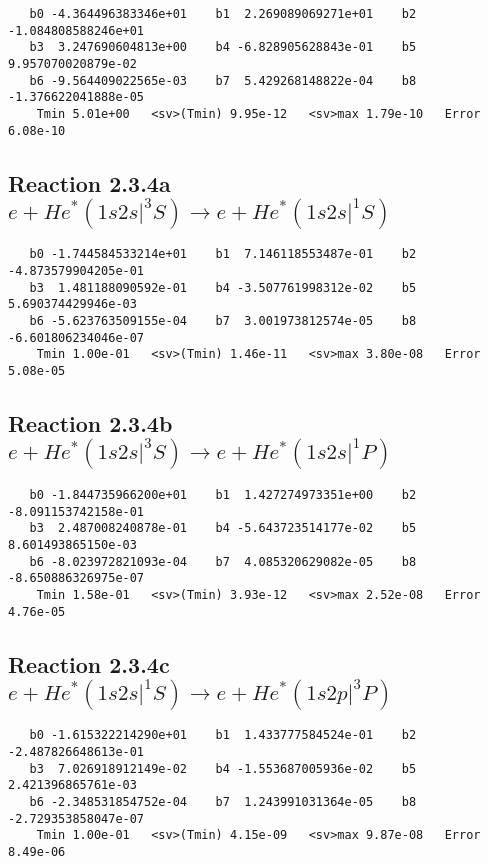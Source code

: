 \documentclass[12pt]{article}
\begin{document}
\begin{small}\begin{verbatim}
   b0 -4.364496383346e+01    b1  2.269089069271e+01    b2 -1.084808588246e+01
   b3  3.247690604813e+00    b4 -6.828905628843e-01    b5  9.957070020879e-02
   b6 -9.564409022565e-03    b7  5.429268148822e-04    b8 -1.376622041888e-05
    Tmin 5.01e+00   <sv>(Tmin) 9.95e-12   <sv>max 1.79e-10   Error 6.08e-10
\end{verbatim}\end{small}

\newpage
\subsection{
Reaction 2.3.4a $  e + He^*(1s2s|^3S) \rightarrow e + He^*(1s2s|^1S)$}


\begin{small}\begin{verbatim}
   b0 -1.744584533214e+01    b1  7.146118553487e-01    b2 -4.873579904205e-01
   b3  1.481188090592e-01    b4 -3.507761998312e-02    b5  5.690374429946e-03
   b6 -5.623763509155e-04    b7  3.001973812574e-05    b8 -6.601806234046e-07
    Tmin 1.00e-01   <sv>(Tmin) 1.46e-11   <sv>max 3.80e-08   Error 5.08e-05
\end{verbatim}\end{small}

\newpage
\subsection{
Reaction 2.3.4b $  e + He^*(1s2s|^3S) \rightarrow e + He^*(1s2s|^1P)$}


\begin{small}\begin{verbatim}
   b0 -1.844735966200e+01    b1  1.427274973351e+00    b2 -8.091153742158e-01
   b3  2.487008240878e-01    b4 -5.643723514177e-02    b5  8.601493865150e-03
   b6 -8.023972821093e-04    b7  4.085320629082e-05    b8 -8.650886326975e-07
    Tmin 1.58e-01   <sv>(Tmin) 3.93e-12   <sv>max 2.52e-08   Error 4.76e-05
\end{verbatim}\end{small}

\newpage
\subsection{
Reaction 2.3.4c $  e + He^*(1s2s|^1S) \rightarrow e + He^*(1s2p|^3P)$}


\begin{small}\begin{verbatim}
   b0 -1.615322214290e+01    b1  1.433777584524e-01    b2 -2.487826648613e-01
   b3  7.026918912149e-02    b4 -1.553687005936e-02    b5  2.421396865761e-03
   b6 -2.348531854752e-04    b7  1.243991031364e-05    b8 -2.729353858047e-07
    Tmin 1.00e-01   <sv>(Tmin) 4.15e-09   <sv>max 9.87e-08   Error 8.49e-06
\end{verbatim}\end{small}
\end{document}
